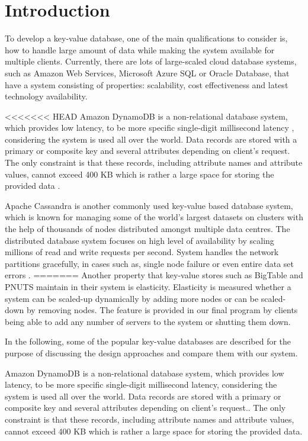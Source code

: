 \section{Introduction}
\label{sec:introduction}

To develop a key-value database, one of the main qualifications to consider is, how to handle large amount of data while making the system available for multiple clients. Currently, there are lots of large-scaled cloud database systems, such as Amazon Web Services, Microsoft Azure SQL or Oracle Database, that have a system consisting of properties: scalability, cost effectiveness and latest technology availability. 

<<<<<<< HEAD
Amazon DynamoDB is a non-relational database system, which provides low latency, to be more specific single-digit millisecond latency \cite{amazon}, considering the system is used all over the world. Data records are stored with a primary or composite key and several attributes depending on client's request. The only constraint is that these records, including attribute names and attribute values, cannot exceed 400 KB which is rather a large space for storing the provided data \cite{amazon}.

Apache Cassandra is another commonly used key-value based database system, which is known for managing some of the world's largest datasets on clusters with the help of thousands of nodes distributed amongst multiple data centres. The distributed database system focuses on high level of availability by scaling millions of read and write requests per second. System handles the network partitions gracefully, in cases such as, single node failure or even entire data set errors \cite{chebotko2015big}.
=======
Another property that key-value stores such as BigTable and PNUTS maintain in their system is elasticity. Elasticity is measured whether a system can be scaled-up dynamically by adding more nodes or can be scaled-down by removing nodes\cite{agrawal2011database}. The feature is provided in our final program by clients being able to add any number of servers to the system or shutting them down.

In the following, some of the popular key-value databases are described for the purpose of  discussing the design approaches and compare them with our system.

Amazon DynamoDB is a non-relational database system, which provides low latency, to be more specific single-digit millisecond latency\cite{amazon}, considering the system is used all over the world. Data records are stored with a primary or composite key and several attributes depending on client's request.\cite{kalid2017big}. The only constraint is that these records, including attribute names and attribute values, cannot exceed 400 KB which is rather a large space for storing the provided data\cite{amazon}.

